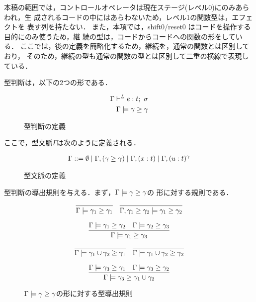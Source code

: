 本稿の範囲では，コントロールオペレータは現在ステージ(レベル0)にのみあらわれ，生
成されるコードの中にはあらわないため，レベル1の関数型は，エフェクトを
表す列を持たない．
また，本項では，shift0/reset0 はコードを操作する目的にのみ使うため，継
続の型は，コードからコードへの関数の形をしている．
ここでは，後の定義を簡略化するため，継続を，通常の関数とは区別しており，
そのため，継続の型も通常の関数の型とは区別して二重の横線で表現している．

型判断は，以下の2つの形である．

\begin{figure}[H]
  \centering
  \begin{align*}
    \Gamma \vdash^{L} e : t ;~\sigma \\
    \Gamma \models \gamma \ge \gamma
  \end{align*}
  \caption{型判断の定義}
  \label{fig:judgement_def}
\end{figure}

ここで，型文脈$\Gamma$は次のように定義される．

\begin{figure}[H]
  \centering
  \begin{align*}
    \Gamma ::= \emptyset
    \mid \Gamma, (\gamma \ge \gamma)
    \mid \Gamma, (x : t)
    \mid \Gamma, (u : t)^{\gamma}
  \end{align*}
  \caption{型文脈の定義}
  \label{fig:type_context_def}
\end{figure}

\hrulefill

型判断の導出規則を与える．まず，$\Gamma \models \gamma \ge \gamma$の
形に対する規則である．

\begin{figure}[H]
  \centering
  \[
    \infer
    {\Gamma \models \gamma_1 \ord \gamma_1}
    {}
    \quad
    \infer
    {\Gamma, \gamma_1 \ord \gamma_2 \models \gamma_1 \ord \gamma_2}
    {}
  \]

  \[
    \infer
    {\Gamma \models \gamma_1 \ord \gamma_3}
    {\Gamma \models \gamma_1 \ord \gamma_2 & \Gamma \models \gamma_2 \ord \gamma_3}
  \]

  \[
    \infer
    {\Gamma \models \gamma_1 \cup \gamma_2 \ord \gamma_1}
    {}
    \quad
    \infer
    {\Gamma \models \gamma_1 \cup \gamma_2 \ord \gamma_2}
    {}
  \]

  \[
    \infer
    {\Gamma \models \gamma_3 \ord \gamma_1 \cup \gamma_2}
    {\Gamma \models \gamma_3 \ord \gamma_1
      &\Gamma \models \gamma_3 \ord \gamma_2}
  \]
  \caption{$\Gamma \models \gamma \ge \gamma$の形に対する型導出規則}
  \label{fig:gmg_rule}
\end{figure}
\hrulefill

